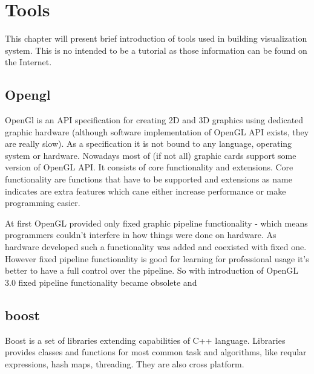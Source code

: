 

\chapter{Tools}

\graphicspath{{techniques/figures/}}


This chapter will present brief introduction of tools used in building visualization system. This is no intended to be a tutorial as those information can be found on the Internet. 

\section{Opengl}
OpenGl is an API specification for creating 2D and 3D graphics using dedicated graphic hardware (although software implementation of OpenGL API exists, they are really slow). As a specification it is not bound to any language, operating system or hardware. Nowadays most of (if not all) graphic cards support some version of OpenGL API. It consists of core functionality and extensions. Core functionality are functions that have to be supported and extensions as name indicates are extra features which cane either increase performance or make programming easier.

At first OpenGL provided only fixed graphic pipeline functionality - which means programmers couldn't interfere in how things were done on hardware. As hardware developed such a functionality was added and coexisted with fixed one. However fixed pipeline functionality is good for learning for professional usage it's better to have a full control over the pipeline. So with introduction of OpenGL 3.0 fixed pipeline functionality became obsolete and 

\section{boost}
Boost is a set of libraries extending capabilities of C++ language. Libraries provides classes and functions for most common task and algorithms, like reqular expressions, hash maps, threading. They are also cross platform. 

